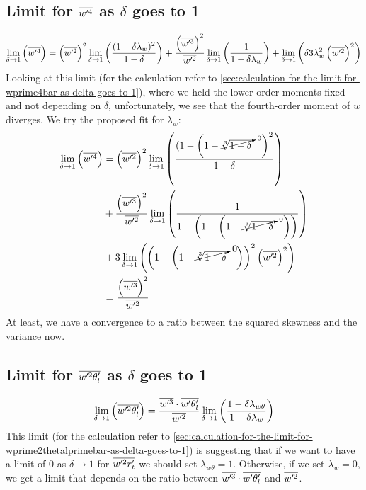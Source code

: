 \subsection{Limit for \texorpdfstring{$\overline{w'^4}$}{wprime4bar} as \texorpdfstring{$\delta$}{delta} goes to 1}
\label{subsec:limit-for-wprime4bar-as-delta-goes-to-1}

\begin{align}
    \label{eq:limit_wprime4_delta_to_1}
    \lim_{\delta \to 1}\left(\overline{w'^4}\right)
    = \left(\overline{w'^2}\right)^2 \lim_{\delta \to 1} \left(\frac{ (1-\delta \lambda_w)^2}{1-\delta}\right) +
    \frac{\left(\overline{w'^3}\right)^2}{\overline{w'^2}} \lim_{\delta \to 1}\left(\frac{1}{1-\delta \lambda_w} \right) +
    \lim_{\delta \to 1}\left(\delta 3 \lambda_w^2 \left(\overline{w'^2}\right)^2\right)
\end{align}
Looking at this limit (for the calculation refer to \cref{sec:calculation-for-the-limit-for-wprime4bar-as-delta-goes-to-1}),
where we held the lower-order moments fixed and not depending on $\delta$,
unfortunately, we see that the fourth-order moment of $w$ diverges.
We try the proposed fit for $\lambda_w$:
\begin{align}
    \label{eq:limit_wprime4_delta_to_1_lambda_w_fit}
    \lim_{\delta \to 1}\left(\overline{w'^4}\right)
    &= \left(\overline{w'^2}\right)^2
    \lim_{\delta \to 1} \left(\frac{(1 - \left(1-\cancelto{0}{\sqrt[3]{1-\delta}}\quad\right)^2}{1-\delta}\right)
    \\
    &+ \frac{\left(\overline{w'^3}\right)^2}{\overline{w'^2}}
    \lim_{\delta \to 1}\left(\frac{1}{1-\left(1 - \left(1-\cancelto{0}{\sqrt[3]{1-\delta}}\quad\right) \right)} \right)
    \\
    &+ 3
    \lim_{\delta \to 1}\left(\left( 1 - \left(1-\cancelto{0}{\sqrt[3]{1-\delta}}\quad\right) \right)^2 \left(\overline{w'^2}\right)^2\right)
    \\
    &= \frac{\left(\overline{w'^3}\right)^2}{\overline{w'^2}}
\end{align}
At least, we have a convergence to a ratio between the squared skewness and the variance now.

\subsection{Limit for \texorpdfstring{$\overline{w'^2 \theta_l'}$}{wprime2thetalbar} as \texorpdfstring{$\delta$}{delta} goes to 1}
\label{subsec:limit-for-wprime2thetalbar-as-delta-goes-to-1}

\begin{align}
    \label{eq:limit_wprime2thetalbar_delta_to_1}
    \lim_{\delta \to 1}\left(\overline{w'^2 \theta_l'}\right)
    = \frac{\overline{w'^3} \cdot \overline{w'\theta_l'}}{\overline{w'^2}}
    \lim_{\delta \to 1}
    \left(\frac{1 - \delta \lambda_{w\theta}}{1-\delta \lambda_w}\right)
\end{align}
This limit (for the calculation refer to \cref{sec:calculation-for-the-limit-for-wprime2thetalprimebar-as-delta-goes-to-1})
is suggesting that if we want to have a limit of 0 as $\delta \to 1$ for $\overline{w'^2 r_t'}$ we should set $\lambda_{w\theta} = 1$.
Otherwise, if we set $\lambda_w = 0$, we get a limit that depends on the ratio between $\overline{w'^3} \cdot \overline{w' \theta_l'}$ and $\overline{w'^2}$.


